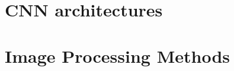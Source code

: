 \section{CNN architectures}
\vspace{0.2in}
\hspace*{0.16in}

\section{Image Processing Methods}
\vspace{0.2in}
\hspace*{0.16in}
